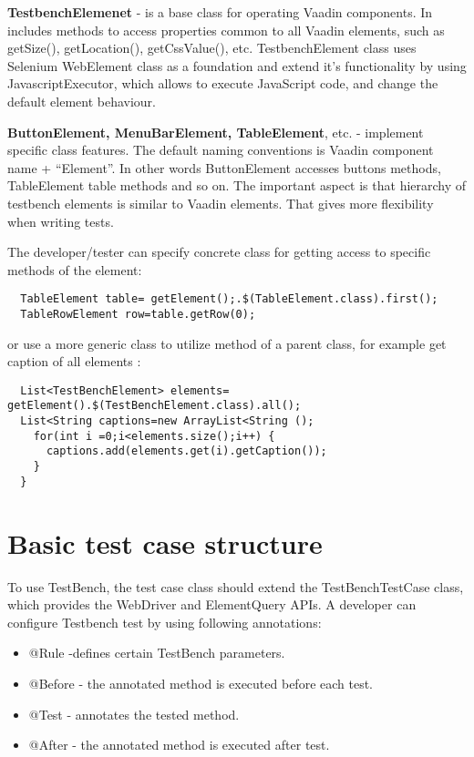 \textbf{TestbenchElemenet} - is a base class for operating Vaadin components. In
includes methods to access properties common to all Vaadin elements, such as getSize(), getLocation(), getCssValue(), etc.
TestbenchElement class uses Selenium WebElement class as a foundation and extend
it's functionality by using JavascriptExecutor,
which allows to execute JavaScript code, and change the default element behaviour.

\textbf{ButtonElement, MenuBarElement, TableElement}, etc. - implement specific
class features. The default naming conventions is Vaadin component name + ``Element''.
In other words ButtonElement accesses buttons methods, TableElement table methods and so on.
The important aspect is that hierarchy of testbench elements is similar to Vaadin elements.
That gives more flexibility when writing tests.

The  developer/tester can specify concrete class for getting access to specific methods of the element:
 
 \lstset{language=Java}
  \begin{lstlisting}
  TableElement table= getElement();.$(TableElement.class).first();
  TableRowElement row=table.getRow(0);
 \end{lstlisting}
 
or use a more generic class to utilize method of a parent class, for example get caption of all elements :

  \lstset{language=Java}
  \begin{lstlisting}
  List<TestBenchElement> elements= getElement().$(TestBenchElement.class).all();
  List<String captions=new ArrayList<String ();
    for(int i =0;i<elements.size();i++) {
      captions.add(elements.get(i).getCaption());
    }
  }
  \end{lstlisting}

\section {Basic test case structure}
To use TestBench, the test case class should extend the TestBenchTestCase class,
which provides the WebDriver and ElementQuery APIs. A developer
can configure Testbench test by using following annotations:
\begin{itemize}
  \item @Rule -defines certain TestBench parameters.
  \item @Before - the annotated method is executed before each test.
  \item @Test - annotates the tested method.
  \item @After - the annotated method is executed after test.
\end{itemize}

